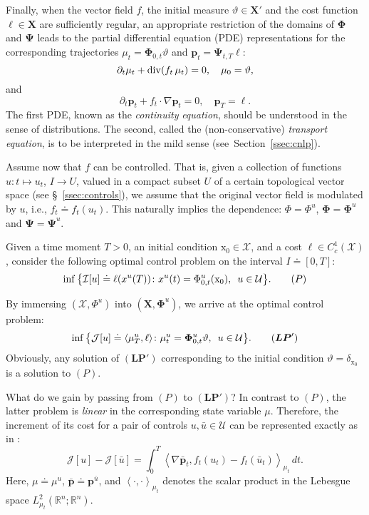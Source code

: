 \documentclass[sn-mathphys-num]{sn-jnl}
\numberwithin{equation}{section}
\theoremstyle{mythm}
\theoremstyle{mydef}
\renewcommand{\div}{\mathop{\rm div}}
\renewcommand{\mathbf}[1]{\bm{#1}}
\begin{document}
Finally, when the vector field \( f \), the initial measure $\vartheta \in \bm X'$ and the cost function $\ell \in \bm X$ are sufficiently regular, an appropriate restriction of the domains of \( \mathbf{\Phi} \) and \( \bm \Psi\)  leads to the partial differential equation (PDE) representations for the corresponding trajectories \( \mu_t = \bm\Phi_{0,t}\vartheta \) and \( \bm p_t = \bm\Psi_{t,T}\ell \):
\[
  \partial_t \mu_t + \div (f_t\,\mu_t) = 0, \quad \mu_0 = \vartheta,\]
and
\[
  \partial_t \bm p_t + f_t \cdot \nabla \bm p_t = 0, \quad \bm p_T = \ell.
\]
The first PDE, known as the \emph{continuity} \emph{equation}, should be understood in the sense of distributions. The second, called the (non-conservative) \emph{transport equation}, is to be interpreted in the mild sense (see~Section~\ref{ssec:cnlp}).


Assume now that \( f \) can be controlled. That is, given a collection of functions \( u\colon t \mapsto u_t \), \( I \to U \), valued in a compact subset \( U \) of a certain topological vector space (see \S~\ref{ssec:controls}), we assume that the original vector field is modulated by \( u \), i.e., \( f_t \doteq f_t(u_t) \). This naturally implies the dependence: \( \Phi = \Phi^u \), $\bm \Phi = \bm \Phi^u$ and $\bm \Psi= \bm \Psi^u$.

Given a time moment \( T > 0 \), an initial condition \( \mathrm{x}_0 \in \mathcal X \), and a cost \( \ell \in C^1_c(\mathcal X) \), consider the following optimal control problem on the interval \( I \doteq [0, T] \): 
\[
    \inf\big\{\mathcal{I}[u] \doteq \ell(x^u(T))\colon x^u(t) = \Phi^u_{0,t}(\mathrm{x}_0), \ \, u \in \mathcal{U}\big\}.\tag{${P}$}
\]

By immersing \((\mathcal X, \Phi^u) \) into \((\bm X, \bm \Phi^u)\), we arrive at the optimal control problem:
\[
    \inf\big\{\mathcal{J}[u] \doteq \langle \mu^u_T, \ell \rangle\colon \mu^u_t = \bm{\Phi}^u_{0,t} \vartheta, \ \, u \in \mathcal{U}\big\}.\tag{${\bm{LP}}'$}
\]
Obviously, any solution of \( (\mathbf{LP}') \) corresponding to the initial condition \( \vartheta = \delta_{\mathrm{x}_0} \) is a solution to \( (P) \). 

What do we gain by passing from \( (P) \) to \( (\mathbf{LP}') \)? In contrast to \( (P) \), the latter problem is \emph{linear} in the corresponding {state variable $\mu$}. Therefore, the increment of its cost for a pair of controls \( u, \bar{u} \in \mathcal{U} \) can be represented exactly as in \cite{pogodaevExactFormulaeIncrement2024}:
\begin{equation}
  \label{eq:exact}
  \mathcal{J}[u] - \mathcal{J}[\bar{u}] = \int_0^T \left<\nabla \bar{\bm p}_t, f_t(u_t)-f_t(\bar{u}_t)\right>_{\mu_t} \, d t. 
\end{equation}
Here, \( \mu \doteq \mu^u \), \( \bar{\bm p} \doteq \bm p^{\bar u}\), and \( \left<\cdot,\cdot\right>_{\mu_t} \) denotes the scalar product in the Lebesgue space \( L^2_{\mu_t}(\mathbb{R}^n;\mathbb{R}^n) \).
\end{document}
